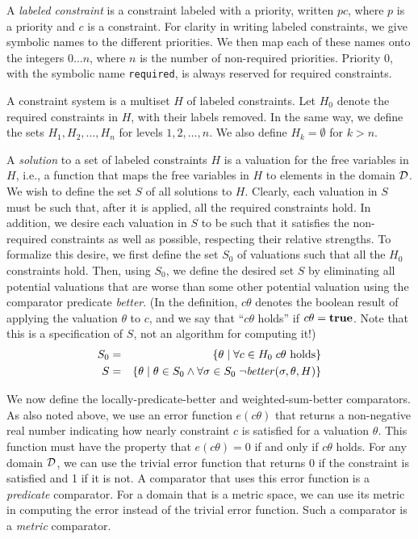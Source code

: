 A \emph{labeled constraint} is a constraint labeled with a priority,
written \mbox{$p c$}, where $p$ is a priority and $c$ is a constraint.
For clarity in writing labeled constraints, we give symbolic names to
the different priorities.  We then map each of these names onto the
integers $0 \ldots n$, where $n$ is the number of non-required
priorities.  Priority 0, with the symbolic name \lstinline{required}, is
always reserved for required constraints.

A constraint system is a multiset $H$ of labeled constraints.  Let
$H_0$ denote the required constraints in $H\!$, with their labels
removed.  In the same way, we define the sets $H_1, H_2, \ldots, H_n$
for levels $1, 2, \ldots, n$.  We also define $H_k = \emptyset$ for
$k>n$.

A \emph{solution} to a set of labeled constraints $H$ is a valuation
for the free variables in $H\!$, i.e., a function that maps the free variables
in $H$ to elements in the domain $\cal D$.  We wish to define the set $S$
of all solutions to $H\!$.  Clearly, each valuation in $S$ must be such that,
after it is applied, all the required constraints hold.  In addition, we desire
each valuation in $S$ to be such that it satisfies the non-required
constraints as well as possible, respecting their relative strengths.  To
formalize this desire, we first define the set $S_{0}$ of valuations such
that all the $H_{0}$ constraints hold.  Then, using $S_{0}$, we define the
desired set $S$ by eliminating all potential valuations that are worse than
some other potential valuation using the comparator predicate \emph{better}.
(In the definition, $c \theta$ denotes the boolean result of applying the
valuation $\theta$ to $c$, and we say that ``$c \theta$ holds'' if $c
\theta = \mbox{\bf true}$. Note that this is a specification of $S$,
not an algorithm for computing it!)
\begin{eqnarray*}
S_{0} & = &
  \left\{ \theta \mid \forall c \in H_{0} \; c \theta \mbox{ holds} \right\} \\
S & = & 
  \left\{ \theta \mid \theta \in S_{0} \wedge
       \forall \sigma \in S_{0} \; \neg \mbox{\em better\/}(\sigma, \theta,H)
       \right\}
\end{eqnarray*}

We now define the locally-predicate-better and weighted-sum-better
comparators.  As also noted above, we use an error function $e(c
\theta)$ that returns a non-negative real number indicating how nearly
constraint $c$ is satisfied for a valuation $\theta$.  This function
must have the property that $e(c \theta) = 0$ if and only if $c
\theta$ holds.  For any domain $\cal D$, we can use the trivial error
function that returns 0 if the constraint is satisfied and 1 if it is
not.  A comparator that uses this error function is a \emph{predicate}
comparator.  For a domain that is a metric space, we can use its
metric in computing the error instead of the trivial error function.
Such a comparator is a \emph{metric} comparator.

